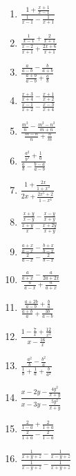 \documentclass{article}
\begin{document}
\begin{enumerate}[label=\bfseries\small 138.\arabic*, itemsep=3cm]
\huge


\item $\frac{1 + \frac{x + 1}{x - 1}}{\frac{1}{x - 1} - \frac{1}{x + 1}}$

\item $\frac{\frac{1}{x - 1} + \frac{2}{x + 1}}{\frac{x - 2}{x + 1} + \frac{2x + 6}{x + 1}}$

\item $\frac{\frac{a}{a - b} - \frac{b}{a + b}}{\frac{a + b}{a - b} + \frac{a}{b}}$

\item $\frac{\frac{x+3}{x+4} - \frac{x+1}{x+2}}{\frac{x-1}{x+2} - \frac{x-3}{x+4}}$ 

\item $\frac{\frac{m^2}{n} - \frac{m^2-n^2}{m+n}}{\frac{m-n}{n} + \frac{n}{m}}$ 

\item $\frac{\frac{a^2}{b^3} + \frac{1}{a}}{\frac{a}{b} - \frac{b-a}{a-b}}$ 

\item $\frac{1 + \frac{2x}{1 + x^2}}{2x + \frac{2x^5 + 2}{1 - x^4}}$

\item $\frac{\frac{x + y}{x - y} - \frac{x - y}{x + y}}{\frac{x + y}{x} - \frac{x + 2y}{x + y}}$ 

\item $\frac{\frac{a + x}{a - x} - \frac{b + x}{b - x}}{\frac{2}{a - x} - \frac{2}{b - x}}$ 

\item $\frac{\frac{a}{a + x} - \frac{a}{2a + 2x}}{\frac{a}{a - x} + \frac{a}{a + x}}$

\item $\frac{\frac{a + 2b}{a - b} + \frac{b}{a}}{\frac{a + b}{a} + \frac{3b}{a - b}}$ 

\item $\frac{1 - \frac{7}{x} + \frac{12}{x^2}}{x - \frac{16}{x}}$ 

\item $\frac{\frac{a^2}{b} - \frac{b^2}{a}}{\frac{1}{b} + \frac{1}{a} + \frac{b}{a^2}}$

\item $\frac{x - 2y - \frac{4y^2}{x+y}}{x - 3y - \frac{5y^2}{x+y}}$

\item $\frac{\frac{2}{1-a} + \frac{2}{1+a}}{\frac{2}{1+a} - \frac{2}{1-a}}$ 

\item $\frac{\frac{1}{x+y+z} - \frac{1}{x-y+z}}{\frac{1}{x-y+z} - \frac{1}{x+y+z}}$ 


\end{enumerate}
\end{document}
